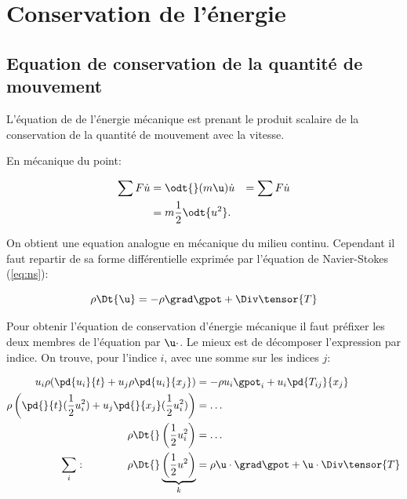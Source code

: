 \chapter{Conservation de l'énergie}

\section{Equation de conservation de la quantité de mouvement}

L'équation de  de l'énergie mécanique est  prenant le produit scalaire de la conservation de la quantité de mouvement avec la vitesse. 

En mécanique du point: 

\begin{displaymath}
  \begin{split}
    \sum F \dot u &= \odt{}(m\u) \dot u &= \sum F \dot u  \\
                  &= m \frac{1}{2} \odt{u^2}. 
  \end{split}
\end{displaymath}

On obtient une equation analogue en mécanique du milieu continu.  Cependant il faut repartir de sa forme différentielle exprimée par l'équation de Navier-Stokes (\eqref{eq:ns}):


\begin{displaymath}
  \rho\Dt{\u} = - \rho \grad \gpot + \Div \tensor{T}
\end{displaymath}

Pour obtenir l'équation de conservation d'énergie mécanique il faut préfixer les deux membres de l'équation par $\u\cdot$. Le mieux est de décomposer l'expression par indice. On trouve, pour l'indice $i$, avec une somme sur les indices $j$:

\begin{displaymath}
  \begin{split}
    u_i  \rho (\pd{u_i}{t} + u_j \rho\pd{u_i}{x_j}) &= - \rho u_i \gpot_i + u_i \pd{T_{ij}}{x_j}  \\
    \rho \left( \pd{}{t}(\frac{1}{2}u_i^2) + u_j \pd{}{x_j}(\frac{1}{2}u_i^2) \right) &= \ldots \\
  \rho \Dt{}\left(\frac{1}{2}u_i^2\right)  &= \ldots \\
  \sum_i: \hspace{4em}  \rho \Dt{}\underbrace{\left(\frac{1}{2}u^2\right)}_{k}  &= \rho \u \cdot \grad \gpot + \u \cdot \Div \tensor{T}
  \end{split}
\end{displaymath}

